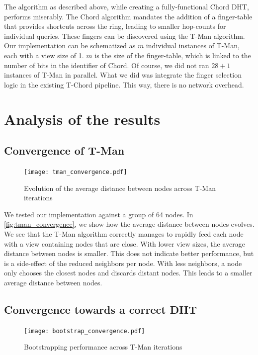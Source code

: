 \documentclass[11pt,a4paper,parskip=half]{scrartcl}
\begin{document}
The algorithm as described above, while creating a fully-functional Chord DHT, performs miserably.
The Chord algorithm mandates the addition of a finger-table that provides shortcuts across the ring, leading to smaller hop-counts for individual queries.
These fingers can be discovered using the T-Man algorithm.
Our implementation can be schematized as $m$ individual instances of T-Man, each with a view size of 1.
$m$ is the size of the finger-table, which is linked to the number of bits in the identifier of Chord.
Of course, we did not ran $28+1$ instances of T-Man in parallel.
What we did was integrate the finger selection logic in the existing T-Chord pipeline.
This way, there is no network overhead.

\section{Analysis of the results}

\subsection{Convergence of T-Man}

\begin{figure}
\centering
\texttt{[image: tman\_convergence.pdf]}
\caption{Evolution of the average distance between nodes across T-Man iterations}
\label{fig:tman_convergence}
\end{figure}

We tested our implementation against a group of 64 nodes.
In \autoref{fig:tman_convergence}, we show how the average distance between nodes evolves.
We see that the T-Man algorithm correctly manages to rapidly feed each node with a view containing nodes that are close.
With lower view sizes, the average distance between nodes is smaller.
This does not indicate better performance, but is a side-effect of the reduced neighbors per node.
With less neighbors, a node only chooses the closest nodes and discards distant nodes.
This leads to a smaller average distance between nodes.

\subsection{Convergence towards a correct DHT}

\begin{figure}
\centering
\texttt{[image: bootstrap\_convergence.pdf]}
\caption{Bootstrapping performance across T-Man iterations}
\label{fig:boostrap_convergence}
\end{figure}
\end{document}
